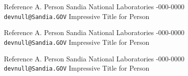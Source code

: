 \documentclass[margin,line,11pt,final]{res}
\begin{document}
\begin{resume}
{%
Reference A. Person \newline
Sandia National Laboratories -000-0000 \newline
{\tt devnull@Sandia.GOV} \newline
Impressive Title for Person



%
Reference A. Person \newline
Sandia National Laboratories -000-0000 \newline
{\tt devnull@Sandia.GOV} \newline
Impressive Title for Person



%
Reference A. Person \newline
Sandia National Laboratories -000-0000 \newline
{\tt devnull@Sandia.GOV} \newline
Impressive Title for Person



}


\end{resume}
\end{document}
